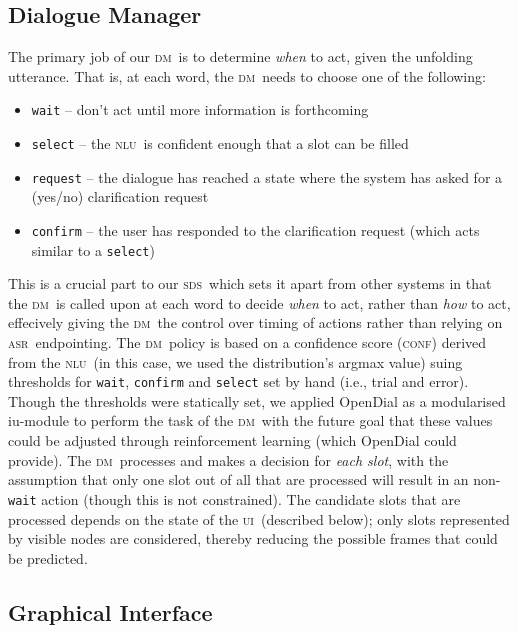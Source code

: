 \documentclass[11pt]{article}
\newcommand{\sds}[0]{\textsc{sds}}
\newcommand{\nlu}[0]{\textsc{nlu}}
\newcommand{\asr}[0]{\textsc{asr}}
\newcommand{\dm}[0]{\textsc{dm}}
\newcommand{\ui}[0]{\textsc{ui}}
\newcommand{\conf}[0]{\textsc{conf}}
\begin{document}
\subsection{Dialogue Manager}

The primary job of our \dm\ is to determine \emph{when} to act, given the unfolding utterance. That is, at each word, the \dm\ needs to choose one of the following:
\begin{itemize}
 \item \texttt{wait} -- don't act until more information is forthcoming
 \item \texttt{select} -- the \nlu\ is confident enough that a slot can be filled
 \item \texttt{request} -- the dialogue has reached a state where the system has asked for a (yes/no) clarification request
 \item \texttt{confirm} -- the user has responded to the clarification request (which acts similar to a \texttt{select})
\end{itemize}

This is a crucial part to our \sds\ which sets it apart from other systems in that the \dm\ is called upon at each word to decide \emph{when} to act, rather than \emph{how} to act, effecively giving the \dm\ the control over timing of actions rather than relying on \asr\ endpointing. The \dm\ policy is based on a confidence score (\conf) derived from the \nlu\ (in this case, we used the distribution's argmax value) suing thresholds for \texttt{wait}, \texttt{confirm} and \texttt{select} set by hand (i.e., trial and error). Though the thresholds were statically set, we applied OpenDial \cite{Lison2015a} as a modularised iu-module to perform the task of the \dm\ with the future goal that these values could be adjusted through reinforcement learning (which OpenDial could provide). The \dm\ processes and makes a decision for \emph{each slot}, with the assumption that only one slot out of all that are processed will result in an non-\texttt{wait} action (though this is not constrained). The candidate slots that are processed depends on the state of the \ui\ (described below); only slots represented by visible nodes are considered, thereby reducing the possible frames that could be predicted.

\subsection{Graphical Interface}
\label{section:display}
\end{document}
